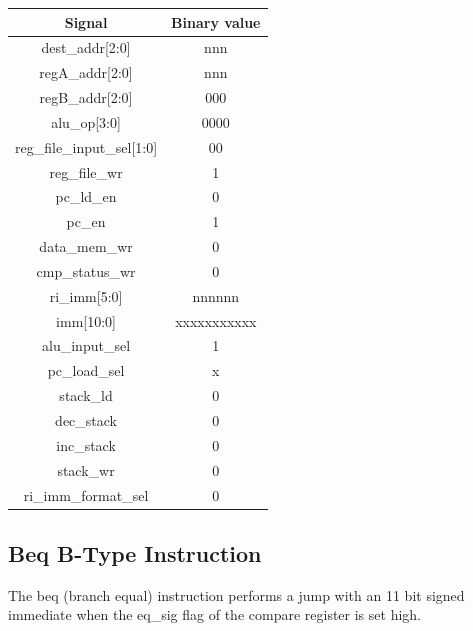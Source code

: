 \documentclass{article}
\begin{document}
\begin{par}
	\begin{center}
		\begin{tabular}{|c|c|}
			\hline 
			\textbf{Signal} & \textbf{Binary value} \\ 
			\hline 
			dest\_addr[2:0] & nnn \\ 
			\hline 
			regA\_addr[2:0] & nnn \\ 
			\hline 
			regB\_addr[2:0] & 000 \\ 
			\hline 
			alu\_op[3:0] & 0000 \\ 
			\hline 
			reg\_file\_input\_sel[1:0] & 00 \\ 
			\hline 
			reg\_file\_wr & 1 \\ 
			\hline 
			pc\_ld\_en & 0 \\ 
			\hline 
			pc\_en & 1 \\ 
			\hline 
			data\_mem\_wr & 0 \\ 
			\hline 
			cmp\_status\_wr & 0 \\ 
			\hline 
			ri\_imm[5:0] & nnnnnn \\ 
			\hline 
			imm[10:0] & xxxxxxxxxxx \\ 
			\hline 
			alu\_input\_sel & 1 \\ 
			\hline 
			pc\_load\_sel & x \\ 
			\hline 
			stack\_ld & 0 \\ 
			\hline 
			dec\_stack & 0 \\ 
			\hline 
			inc\_stack & 0 \\ 
			\hline 
			stack\_wr & 0 \\ 
			\hline 
			ri\_imm\_format\_sel & 0 \\ 
			\hline 
		\end{tabular} 
	\end{center}

	\newpage
	\subsection{Beq B-Type Instruction}
	
	The beq (branch equal) instruction performs a jump with an 11 bit signed immediate when the eq\_sig flag of the compare register is set high. 
	

\end{par}
\end{document}
